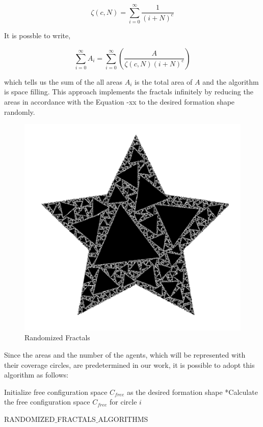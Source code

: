 \begin{equation}
\zeta(c,N) = \sum_{i=0}^{\infty} \frac{1}{(i+N)^c}
\end{equation}

It is possble to write, 
	
\begin{equation}
\sum_{i=0}^{\infty}A_i = \sum_{i = 0}^{\infty}\left(\frac{A}{\zeta(c,N)(i+N)^c}\right)
\end{equation}
	
which tells us the sum of the all areas $A_i$ is the total area of $A$ and the algorithm is space filling. This approach implements the fractals infinitely by reducing the areas in accordance with the Equation -xx to the desired formation shape randomly. 

\begin{figure}[H]
\caption{Randomized Fractals}
\centering
\includegraphics[scale = 0.70]{randomized}
\end{figure}
	
Since the areas and the number of the agents, which will be represented with their coverage circles, are predetermined in our work, it is possible to adopt this algorithm as follows:
		
\begin{algorithm}[H]
Initialize free configuration space $C_{free}$ as the desired formation shape
{		
*Calculate the free configuration space $C_{free}$ for circle $i$\;
}												
\caption{RANDOMIZED$\_$FRACTALS$\_$ALGORITHMS}
\end{algorithm}
		

